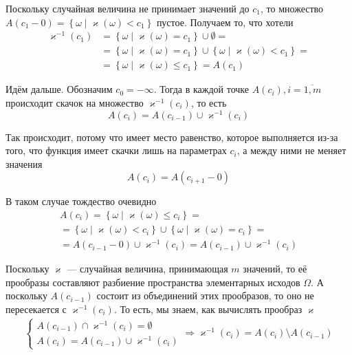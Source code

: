 Поскольку случайная величина не принимает значений до $c_1$,
то множество $A\left( c_1-0 \right)
=\left\{ \omega \mid \varkappa\left( \omega \right) < c_1 \right\}$ пустое.
Получаем то, что хотели
\begin{align*}
    \varkappa^{-1}\left( c_1 \right)
        &= \left\{ \omega \mid \varkappa\left( \omega \right) = c_1 \right\}
            \cup \emptyset = \\
        &= \left\{ \omega \mid \varkappa\left( \omega \right) = c_1 \right\}
            \cup \left\{ \omega
                \mid \varkappa\left( \omega \right) < c_1 \right\} = \\
        &= \left\{ \omega \mid \varkappa\left( \omega \right) \le c_1 \right\}
        = A\left( c_1 \right)
\end{align*}

Идём дальше. Обозначим $c_0 = -\infty$.
Тогда в каждой точке $A\left( c_i \right), i = \overline{1,m}$
происходит скачок на множество $\varkappa^{-1}\left( c_i \right)$, то есть 
$$A\left( c_i \right)
    = A\left( c_{i-1} \right) \cup \varkappa^{-1}\left( c_i \right)$$

Так происходит, потому что имеет место равенство,
которое выполняется из-за того,
что функция имеет скачки лишь на параметрах $c_i$,
а между ними не меняет значения
$$A\left( c_i \right) = A\left( c_{i+1} - 0 \right)$$

В таком случае тождество очевидно
\begin{align*}
A\left( c_i \right)
    = \left\{ \omega \mid \varkappa\left( \omega \right) \le c_i \right\} = \\
    = \left\{ \omega \mid \varkappa\left( \omega \right) < c_i \right\} \cup
        \left\{ \omega \mid \varkappa\left( \omega \right) = c_i \right\} = \\
    = A\left( c_{i-1}-0 \right) \cup \varkappa^{-1}\left( c_i \right)
    = A\left( c_{i-1} \right) \cup \varkappa^{-1}\left( c_i \right)
\end{align*}

Поскольку $\varkappa$ --- случайная величина, принимающая $m$ значений,
то её прообразы составляют разбиение пространства элементарных исходов $\Omega$.
А поскольку $A\left( c_{i-1} \right)$ состоит из объединений этих прообразов,
то оно не пересекается с $\varkappa^{-1}\left( c_i \right)$.
То есть, мы знаем, как вычислять прообраз $\varkappa$
\begin{align*}
    \begin{cases}
        A\left( c_{i-1} \right) \cap \varkappa^{-1}\left( c_i \right)
            = \emptyset \\
        A\left( c_i \right)
            = A\left( c_{i-1} \right) \cup \varkappa^{-1}\left( c_i \right)
    \end{cases}
    \Rightarrow \varkappa^{-1}\left( c_i \right) =
        A\left( c_{i} \right) \setminus A\left( c_{i-1} \right)
\end{align*}

